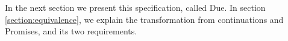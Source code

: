 In the next section we present this specification, called Due.
In section \ref{section:equivalence}, we explain the transformation from continuations and Promises, and its two requirements.




